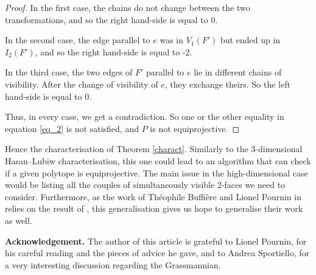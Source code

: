\documentclass[12pt, notitlepage]{article}
\theoremstyle{plain}
\theoremstyle{definition}
\theoremstyle{plain}
\theoremstyle{remark}
\theoremstyle{plain}
\theoremstyle{plain}
\begin{document}
\begin{proof}
    In the first case, the chains do not change between the two transformations, and so the right hand-side is equal to 0.
    
    In the second case, the edge parallel to $e$ was in $V_1(F')$ but ended up in $I_2(F')$, and so the right hand-side is equal to -2.
    
    In the third case, the two edges of $F'$ parallel to $e$ lie in different chains of visibility. After the change of visibility of $e$, they exchange theirs. So the left hand-side is equal to 0.
    
    Thus, in every case, we get a contradiction. So one or the other equality in equation \eqref{eq_2} is not satisfied, and $P$ is not equiprojective.
\end{proof}

Hence the characterisation of Theorem \ref{charact}. Similarly to the 3-dimensional Hasan--Lubiw characterisation, this one could lead to an algorithm that can check if a given polytope is equiprojective. The main issue in the high-dimensional case would be listing all the couples of simultaneously visible 2-faces we need to consider. Furthermore, as the work of Théophile Buffière and Lionel Pournin in \cite{TBLP} relies on the result of \cite{MHAL}, this generalisation gives us hope to generalise their work as well.

\bigskip

\textbf{Acknowledgement.} The author of this article is grateful to Lionel Pournin, for his careful reading and the pieces of advice he gave, and to Andrea Sportiello, for a very interesting discussion regarding the Grassmannian.

\printbibliography
\end{document}
